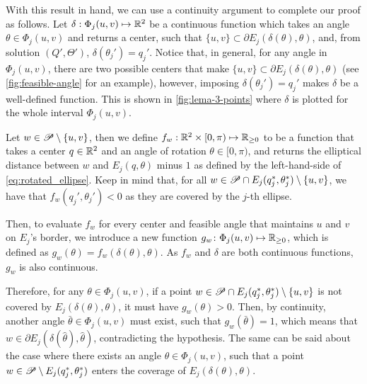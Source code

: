 \begin{pf}
	With this result in hand, we can use a continuity argument to complete our proof as follows.
	Let $\delta : \Phi_j(u,v) \mapsto \mathbb{R}^2$ be a continuous function which takes an angle $\theta\in\Phi_j(u,v)$ and returns a center, such that $\{u,v\} \subset \partial E_j(\delta(\theta), \theta)$, and, from solution $(Q', \Theta')$, $\delta(\theta_j') = q_j'$. Notice that, in general, for any angle in $\Phi_j(u,v)$, there are two possible centers that make $\{u,v\} \subset \partial E_j(\delta(\theta), \theta)$ (see \autoref{fig:feasible-angle} for an example), however, imposing $\delta(\theta_j') = q_j'$ makes $\delta$ be a well-defined function. This is shown in \autoref{fig:lema-3-points} where $\delta$ is plotted for the whole interval $\Phi_j(u,v)$.
	
	Let $w\in \mathscr{P} \setminus \{u,v\}$, then we define $f_w  : \mathbb{R}^2 \times [0, \pi) \mapsto \mathbb{R}_{\ge0}$ to be a function that takes a center $q \in \mathbb{R}^2$ and an angle of rotation $\theta\in [0, \pi)$, and returns the elliptical distance between $w$ and $E_j(q, \theta)$ minus $1$ as defined by the left-hand-side of \autoref{eq:rotated_ellipse}. Keep in mind that, for all $w\in \mathscr{P} \cap E_j(q_j^*, \theta_j^*)\setminus \{u,v\}$, we have that $f_w(q_j', \theta_j') < 0$ as they are covered by the $j$-th ellipse.
	
	Then, to evaluate $f_w$ for every center and feasible angle that maintains $u$ and $v$ on $E_j$'s border, we introduce a new function $g_w\colon \Phi_j(u,v) \mapsto \mathbb{R}_{\ge0}$, which is defined as $g_w(\theta) = f_w(\delta(\theta), \theta)$.
	As $f_w$ and $\delta$ are both continuous functions, $g_w$ is also continuous.
	
	Therefore, for any $\theta\in\Phi_j(u,v)$, if a point $w \in \mathscr{P} \cap E_j(q_j^*, \theta_j^*)\setminus\{u,v\}$ is not covered by $E_j(\delta(\theta), \theta)$, it must have $g_w(\theta)>0$. Then, by continuity, another angle $\bar{\theta} \in \Phi_j(u,v)$ must exist, such that $g_w(\bar{\theta})=1$, which means that $w\in \partial E_j(\delta(\hat{\theta}), \hat{\theta})$, contradicting the hypothesis. The same can be said about the case where there exists an angle $\theta \in \Phi_j(u,v)$, such that a point $w \in \mathscr{P} \setminus E_j(q_j^*, \theta_j^*)$ enters the coverage of $E_j(\delta(\theta), \theta)$.
\end{pf}